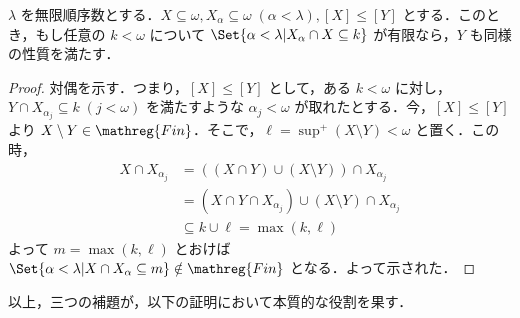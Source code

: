 \documentclass[a4j,xelatex,ja=standard]{bxjsarticle}
\newcommand{\Fin}{\mathreg{Fin}}
\begin{document}
\begin{lemma}
 $\lambda$ を無限順序数とする．$X \subseteq \omega, X_\alpha \subseteq \omega \; (\alpha < \lambda), [X] \leq [Y]$ とする．このとき，もし任意の $k < \omega$ について $\Set{\alpha < \lambda | X_\alpha \cap X \subseteq k}$ が有限なら，$Y$ も同様の性質を満たす．
\end{lemma}
\begin{proof}
 対偶を示す．つまり，$[X] \leq [Y]$ として，ある $k < \omega$ に対し，$Y \cap X_{\alpha_j} \subseteq k \; (j < \omega)$ を満たすような $\alpha_j < \omega$ が取れたとする．今，$[X] \leq [Y]$ より $X \setminus Y \in \Fin$．そこで，$\ell = \sup^+(X \setminus Y) < \omega$ と置く．この時，
 \begin{align*}
  X \cap X_{\alpha_j} &= ((X \cap Y) \cup (X \setminus Y)) \cap X_{\alpha_j}\\
  &= (X \cap Y \cap X_{\alpha_j}) \cup (X \setminus Y) \cap X_{\alpha_j}\\
  &\subseteq k \cup \ell = \max(k, \ell) 
 \end{align*}
 よって $m = \max(k, \ell)$ とおけば $\Set{\alpha < \lambda | X \cap X_\alpha \subseteq m} \notin \Fin$ となる．よって示された．\mbox{}
\end{proof}

以上，三つの補題が，以下の証明において本質的な役割を果す．
\end{document}
